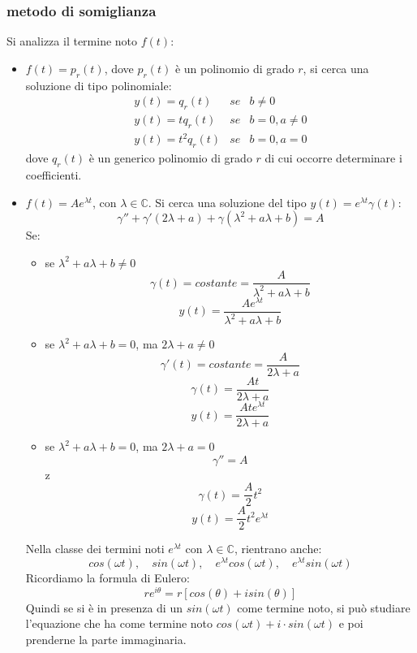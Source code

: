 \subsubsection*{metodo di somiglianza}
Si analizza il termine noto $f(t)$:
\begin{itemize}
    \item $f(t) = p_r(t)$, dove $p_r(t)$ è un polinomio di grado $r$, si cerca una soluzione di tipo polinomiale:
    \[
        \begin{matrix}
            y(t) = q_r(t)  &se &b\neq0\\
            y(t) = tq_r(t) &se &b=0, a\neq 0\\
            y(t)=t^2q_r(t) &se &b=0, a=0
        \end{matrix}
    \]
    dove $q_r(t)$ è un generico polinomio di grado $r$ di cui occorre determinare i coefficienti.
    \item $f(t) = Ae^{\lambda t}$, con $\lambda \in \mathbb{C}$. Si cerca una soluzione del tipo $y(t) = e^{\lambda t}\gamma(t)$:
    \[
        \gamma'' + \gamma'(2 \lambda + a) + \gamma (\lambda^2 + a \lambda + b) = A
    \]
    Se:
    \begin{itemize}
        \item se $\lambda^2 + a \lambda + b \neq 0$
        \[
            \gamma(t) = costante = \frac{A}{\lambda^2 + a \lambda + b}
        \]
        \[
            y(t) =\frac{Ae^{\lambda t}}{\lambda^2 + a \lambda + b}
        \]
        \item se $\lambda^2 + a \lambda + b = 0$, ma $2 \lambda + a \neq 0$
        \[
            \gamma'(t) = costante = \frac{A}{2 \lambda + a}
        \]
        \[
            \gamma(t) = \frac{At}{2 \lambda + a}
        \]
        \[
            y(t) = \frac{At e^{\lambda t}}{2 \lambda + a}
        \]
        \item se $\lambda^2 + a \lambda + b = 0$, ma $2 \lambda + a = 0$
        \[
            \gamma''= A
        \]z
        \[
            \gamma(t) = \frac{A}{2}t^2
        \]
        \[
            y(t) = \frac{A}{2}t^2e^{\lambda t}
        \]
    \end{itemize}
    Nella classe dei termini noti $e^{\lambda t}$ con $\lambda \in \mathbb{C}$, rientrano anche:
    \[
        cos(\omega t), \quad sin(\omega t), \quad e^{\lambda t}cos(\omega t), \quad e^{\lambda t}sin(\omega t)
    \]
    Ricordiamo la formula di Eulero:
    \[
        re^{i \theta} =r[cos(\theta) + i sin(\theta)]
    \]
    Quindi se si è in presenza di un $sin(\omega t)$ come termine noto, si può studiare l'equazione che ha come termine noto $cos(\omega t) + i \cdot sin(\omega t)$ e poi prenderne la parte immaginaria.\newline

\end{itemize}
